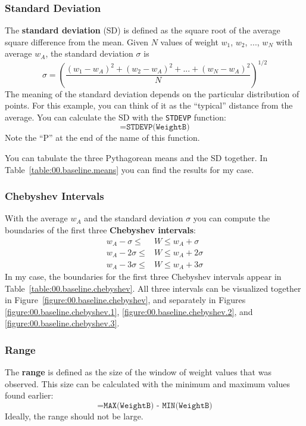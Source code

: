 \subsubsection{Standard Deviation}
%
The \textbf{standard deviation} (SD) is defined as the square root of the average square difference from the mean. Given $N$ values of weight $w_{1}$, $w_{2}$, ..., $w_{N}$ with average $w_{A}$, the standard deviation $\sigma$ is
\begin{equation}
    \sigma = \left( \frac{(w_{1} - w_{A})^{2} + (w_{2} - w_{A})^{2} + ... + (w_{N} - w_{A})^{2}}{N}  \right)^{1/2}
\end{equation}
The meaning of the standard deviation depends on the particular distribution of points. For this example, you can think of it as the ``typical'' distance from the average. You can calculate the SD with the \texttt{STDEVP} function:
\begin{equation}
    \texttt{=STDEVP(WeightB)}
\end{equation}
Note the ``P'' at the end of the name of this function.

You can tabulate the three Pythagorean means and the SD together. In Table~\ref{table:00.baseline.means} you can find the results for my case.
%
\subsubsection{Chebyshev Intervals}
%
With the average $w_{A}$ and the standard deviation $\sigma$ you can compute the boundaries of the first three \textbf{Chebyshev intervals}:
\begin{align}
    w_{A} - \sigma \leq {}&W \leq w_{A} + \sigma \\
    w_{A} - 2\sigma \leq {}&W \leq w_{A} + 2\sigma \\
    w_{A} - 3\sigma \leq {}&W \leq w_{A} + 3\sigma
\end{align}
In my case, the boundaries for the first three Chebyshev intervals appear in Table~\ref{table:00.baseline.chebyshev}. All three intervals can be visualized together in Figure~\ref{figure:00.baseline.chebyshev}, and separately in Figures \ref{figure:00.baseline.chebyshev.1}, \ref{figure:00.baseline.chebyshev.2}, and \ref{figure:00.baseline.chebyshev.3}.
%
\subsubsection{Range}
%
The \textbf{range} is defined as the size of the window of weight values that was observed. This size can be calculated with the minimum and maximum values found earlier:
\begin{equation}
    \texttt{=MAX(WeightB) - MIN(WeightB)}
\end{equation}
Ideally, the range should not be large.
%
